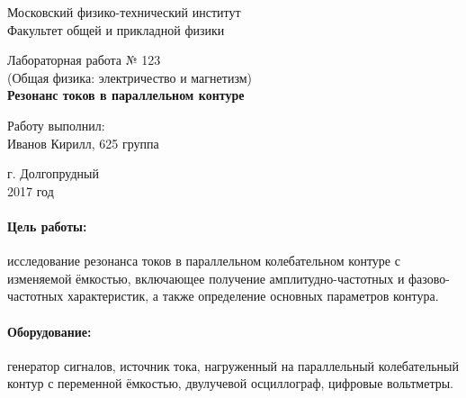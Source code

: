 \documentclass[12pt]{kiarticle}
\begin{document}
\begin{titlepage}
	\begin{center}
		\large 	Московский физико-технический институт \\
		Факультет общей и прикладной физики \\
		\vspace{0.2cm}
		
		\vspace{4.5cm}
		Лабораторная работа № 123 \\ \vspace{0.2cm}
		\large (Общая физика: электричество и магнетизм) \\ \vspace{0.2cm}
		\LARGE \textbf{Резонанс токов в параллельном контуре}
	\end{center}
	\vspace{2.3cm} \large
	
	\begin{center}
		Работу выполнил: \\
		Иванов Кирилл,
		625 группа
		\vspace{10mm}		
		
	\end{center}
	
	\begin{center} \vspace{60mm}
		г. Долгопрудный \\
		2017 год
	\end{center}
\end{titlepage}



\paragraph*{Цель работы:} исследование резонанса токов в параллельном колебательном контуре с изменяемой
ёмкостью, включающее получение амплитудно-частотных и фазово-частотных характеристик, а также определение основных параметров контура.

\paragraph*{Оборудование:} генератор сигналов, источник тока, нагруженный на параллельный колебательный контур с переменной ёмкостью, двулучевой осциллограф, цифровые вольтметры.
\end{document}
